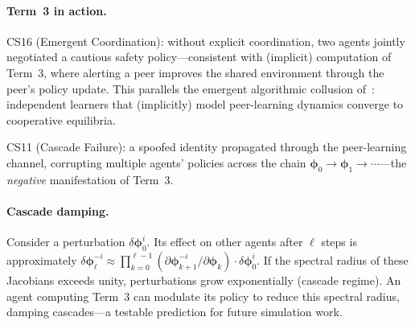 \paragraph{Term~3 in action.} CS16 (Emergent Coordination): without explicit coordination, two agents jointly negotiated a cautious safety policy---consistent with (implicit) computation of Term~3, where alerting a peer improves the shared environment through the peer's policy update. This parallels the emergent algorithmic collusion of~\cite{calvano2020}: independent learners that (implicitly) model peer-learning dynamics converge to cooperative equilibria.

CS11 (Cascade Failure): a spoofed identity propagated through the peer-learning channel, corrupting multiple agents' policies across the chain $\bm{\phi}_0\to\bm{\phi}_1\to\cdots$---the \emph{negative} manifestation of Term~3.

\paragraph{Cascade damping.} Consider a perturbation $\delta\bm{\phi}_0^i$. Its effect on other agents after $\ell$ steps is approximately $\delta\bm{\phi}_\ell^{-i}\approx\prod_{k=0}^{\ell-1}(\partial\bm{\phi}_{k+1}^{-i}/\partial\bm{\phi}_k)\cdot\delta\bm{\phi}_0^i$. If the spectral radius of these Jacobians exceeds unity, perturbations grow exponentially (cascade regime). An agent computing Term~3 can modulate its policy to reduce this spectral radius, damping cascades---a testable prediction for future simulation work.
